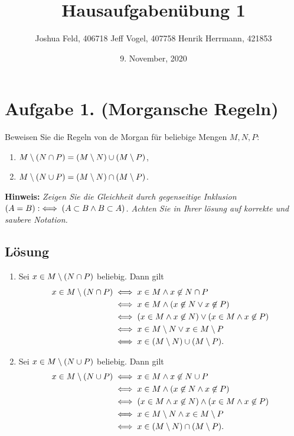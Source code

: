 \documentclass[german,12pt]{homework}
\title{Hausaufgabenübung 1}
\author{Joshua Feld, 406718 \quad Jeff Vogel, 407758 \quad Henrik Herrmann, 421853}
\date{9. November, 2020}
\institute{RWTH Aachen University\\Center for Computational Engineering Science}
\DeclarePairedDelimiter{\enbrace}{(}{)}
\begin{document}
    \maketitle

    \section*{Aufgabe 1. (Morgansche Regeln)}

    \begin{problem}
        Beweisen Sie die Regeln von de Morgan für beliebige Mengen \(M, N, P\):
        \begin{enumerate}
            \item \(M \setminus \enbrace*{N \cap P} = \enbrace*{M \setminus N} \cup \enbrace*{M \setminus P}\),
            \item \(M \setminus \enbrace*{N \cup P} = \enbrace*{M \setminus N} \cap \enbrace*{M \setminus P}\).
        \end{enumerate}

        \textbf{Hinweis:} \quad \emph{Zeigen Sie die Gleichheit durch gegenseitige Inklusion \(\enbrace*{A = B} :\iff \enbrace*{A \subset B \land B \subset A}\). Achten Sie in Ihrer lösung auf korrekte und saubere Notation.}
    \end{problem}

    \subsection*{Lösung}
    \begin{enumerate}
        \item Sei \(x \in M \setminus \enbrace*{N \cap P}\) beliebig. Dann gilt
        \begin{align*}
            x \in M \setminus \enbrace*{N \cap P} &\iff x \in M \land x \not\in N \cap P\\
            &\iff x \in M \land \enbrace*{x \not\in N \lor x \not\in P}\\
            &\iff \enbrace*{x \in M \land x \not\in N} \lor \enbrace*{x \in M \land x \not\in P}\\
            &\iff x \in M \setminus N \lor x \in M \setminus P\\
            &\iff x \in \enbrace*{M \setminus N} \cup \enbrace*{M \setminus P}.
        \end{align*}
        \item Sei \(x \in M \setminus \enbrace*{N \cup P}\) beliebig. Dann gilt
        \begin{align*}
            x \in M \setminus \enbrace*{N \cup P} &\iff x \in M \land x \not\in N \cup P\\
            &\iff x \in M \land \enbrace*{x \not\in N \land x \not\in P}\\
            &\iff \enbrace*{x \in M \land x \not\in N} \land \enbrace*{x \in M \land x \not\in P}\\
            &\iff x \in M \setminus N \land x \in M \setminus P\\
            &\iff x \in \enbrace*{M \setminus N} \cap \enbrace*{M \setminus P}.
        \end{align*}
    \end{enumerate}
\end{document}
